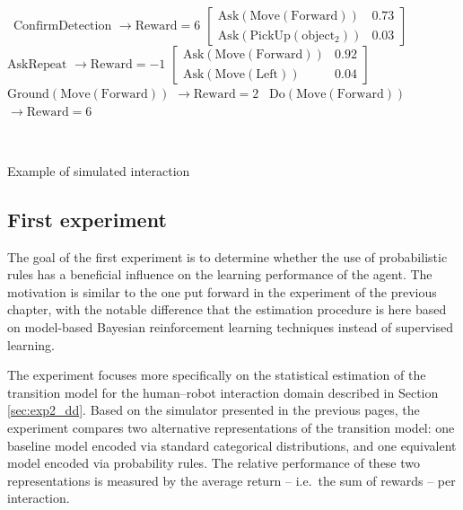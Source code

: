\begin{Transcript}[p!]
\begin{normalsize}
\begin{dialogue}
 \ $\mathrm{ConfirmDetection}$ \hspace{34mm} $\rightarrow \mathrm{Reward} = 6$ \vspace{3mm}
 $\begin{bmatrix}\mathrm{Ask(Move(Forward))} & 0.73 \\
\mathrm{Ask(PickUp(object_2))}& 0.03 \end{bmatrix}$ \vspace{3mm}
 \ $\mathrm{AskRepeat}$ \hspace{47mm} $\rightarrow \mathrm{Reward} = -1$ \vspace{3mm}
 $\begin{bmatrix}\mathrm{Ask(Move(Forward))} & 0.92 \\
\mathrm{Ask(Move(Left))} & 0.04 \end{bmatrix}$ \vspace{3mm}
 \ $\mathrm{Ground(Move(Forward))}$ \hspace{22mm} $\rightarrow \mathrm{Reward} = 2$ \vspace{3mm}
 \ $\mathrm{Do(Move(Forward))}$ \hspace{31mm} $\rightarrow \mathrm{Reward} = 6$
\end{dialogue}
$\phantom{a}$\hspace{13mm} \vspace{3mm}
\end{normalsize}
\caption{Example of simulated interaction}
\end{Transcript}

\subsection{First experiment}

The goal of the first experiment is to determine whether the use of probabilistic rules has a beneficial influence on the learning performance of the agent. The motivation is  similar to the one put forward in the experiment of the previous chapter, with the notable difference that the estimation procedure is here based on model-based Bayesian reinforcement learning techniques instead of supervised learning. 

The experiment focuses more specifically on the statistical estimation of the transition model for the human--robot interaction domain described in Section \ref{sec:exp2_dd}. Based on the simulator presented in the previous pages, the experiment compares two alternative representations of the transition model: one baseline model encoded via standard categorical distributions, and one equivalent model encoded via probability rules.  The relative performance of these two representations is measured by the average return -- i.e.\ the sum of rewards -- per interaction. 

